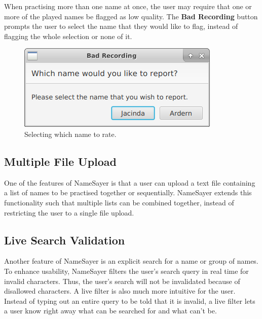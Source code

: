 \documentclass{article}
\begin{document}
When practising more than one name at once, the user may require that one or
more of the played names be flagged as low quality. The \textbf{Bad Recording}
button prompts the user to select the name that they would like to flag, instead
of flagging the whole selection or none of it.

\begin{figure}[H]
	\centerline{\includegraphics[width=\textwidth/2]{images/11_bad_recording.png}}
	\caption{Selecting which name to rate.}
	\label{badrecording}
\end{figure}

\subsection{Multiple File Upload}
One of the features of NameSayer is that a user can upload a text file
containing a list of names to be practised together or  sequentially. NameSayer
extends this functionality such that multiple lists can be combined together,
instead of restricting the user to a single file upload.

\subsection{Live Search Validation}
Another feature of NameSayer is an explicit search for a name or group of names.
To enhance usability, NameSayer filters  the user's search query in real time
for invalid characters. Thus, the user's search will not be invalidated because
of disallowed characters. A live filter is also much more intuitive for the
user. Instead of typing out an entire query to be told that it is invalid, a
live filter lets a user know right away what can be searched for and what can't
be.
\end{document}
